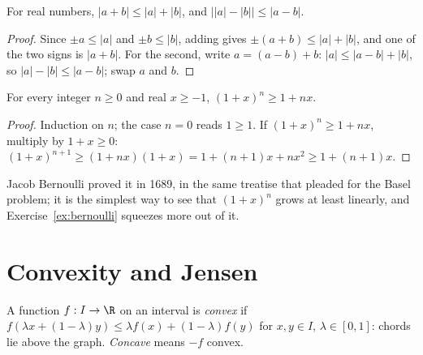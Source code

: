 \begin{propositionx}
For real numbers, $|a+b|\le|a|+|b|$, and $\bigl||a|-|b|\bigr|\le|a-b|$.
\end{propositionx}
\begin{proof}
Since $\pm a\le|a|$ and $\pm b\le|b|$, adding gives $\pm(a+b)\le|a|+|b|$, and one of the two signs is $|a+b|$. For the second, write $a=(a-b)+b$:
$|a|\le|a-b|+|b|$, so $|a|-|b|\le|a-b|$; swap $a$ and $b$.
\end{proof}

\begin{propositionx}
For every integer $n\ge0$ and real $x\ge-1$, $(1+x)^n\ge1+nx$.
\end{propositionx}
\begin{proof}
Induction on $n$; the case $n=0$ reads $1\ge1$. If $(1+x)^n\ge1+nx$, multiply by $1+x\ge0$: $(1+x)^{n+1}\ge(1+nx)(1+x)=1+(n+1)x+nx^2\ge1+(n+1)x$.
\end{proof}

Jacob Bernoulli proved it in 1689, in the same treatise that pleaded for the Basel problem; it is the simplest way to see that $(1+x)^n$ grows at least
linearly, and Exercise~\ref{ex:bernoulli} squeezes more out of it.

\section{Convexity and Jensen}

A function $f:I\to\R$ on an interval is \emph{convex} if $f(\lambda x+(1-\lambda)y)\le\lambda f(x)+(1-\lambda)f(y)$ for $x,y\in I$, $\lambda\in[0,1]$:
chords lie above the graph. \emph{Concave} means $-f$ convex.

